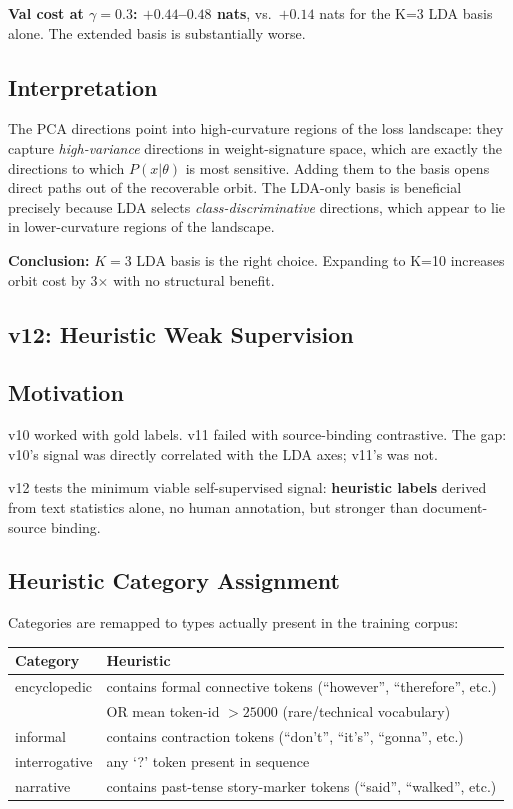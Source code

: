 \documentclass[11pt, a4paper]{article}
\theoremstyle{plain}
\theoremstyle{definition}
\theoremstyle{remark}
\begin{document}
\noindent\textbf{Val cost at $\gamma=0.3$: $+0.44$--$0.48$ nats}, vs.\ $+0.14$ nats for
the K=3 LDA basis alone.
The extended basis is substantially worse.

\subsection{Interpretation}

The PCA directions point into high-curvature regions of the loss landscape:
they capture \emph{high-variance} directions in weight-signature space, which are
exactly the directions to which $P(x|\theta)$ is most sensitive.
Adding them to the basis opens direct paths out of the recoverable orbit.
The LDA-only basis is beneficial precisely because LDA selects
\emph{class-discriminative} directions, which appear to lie in lower-curvature
regions of the landscape.

\textbf{Conclusion:} $K=3$ LDA basis is the right choice.
Expanding to K=10 increases orbit cost by 3$\times$ with no structural benefit.


\subsection{v12: Heuristic Weak Supervision}
\label{sec:v12-design}

\subsection{Motivation}

v10 worked with gold labels.
v11 failed with source-binding contrastive.
The gap: v10's signal was directly correlated with the LDA axes; v11's was not.

v12 tests the minimum viable self-supervised signal: \textbf{heuristic labels}
derived from text statistics alone, no human annotation, but stronger than
document-source binding.

\subsection{Heuristic Category Assignment}

Categories are remapped to types actually present in the training corpus:

\begin{center}\small
\begin{tabular}{ll}
\toprule
\textbf{Category} & \textbf{Heuristic} \\
\midrule
encyclopedic & contains formal connective tokens (``however'', ``therefore'', etc.)\\
             & OR mean token-id $> 25000$ (rare/technical vocabulary) \\
informal     & contains contraction tokens (``don't'', ``it's'', ``gonna'', etc.) \\
interrogative & any `?' token present in sequence \\
narrative    & contains past-tense story-marker tokens (``said'', ``walked'', etc.) \\
\bottomrule
\end{tabular}
\end{center}
\end{document}
